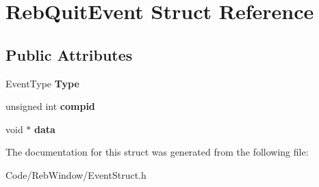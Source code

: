 \hypertarget{struct_reb_quit_event}{}\section{Reb\+Quit\+Event Struct Reference}
\label{struct_reb_quit_event}
\subsection*{Public Attributes}
\begin{DoxyCompactItemize}
\item 
Event\+Type {\bfseries Type}\hypertarget{struct_reb_quit_event_a913fdf3adb6683eac33fe5a6c34d0516}{}\label{struct_reb_quit_event_a913fdf3adb6683eac33fe5a6c34d0516}

\item 
unsigned int {\bfseries compid}\hypertarget{struct_reb_quit_event_a9fb886a65a8104efb8427db827069467}{}\label{struct_reb_quit_event_a9fb886a65a8104efb8427db827069467}

\item 
void $\ast$ {\bfseries data}\hypertarget{struct_reb_quit_event_a5a6cc453ef0d9c5ef6171a9a01a30fb9}{}\label{struct_reb_quit_event_a5a6cc453ef0d9c5ef6171a9a01a30fb9}

\end{DoxyCompactItemize}


The documentation for this struct was generated from the following file\+:\begin{DoxyCompactItemize}
\item 
Code/\+Reb\+Window/Event\+Struct.\+h\end{DoxyCompactItemize}
